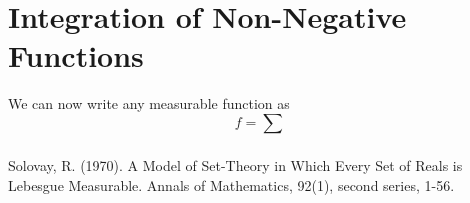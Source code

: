 \documentclass{article}
\theoremstyle{definition}
\theoremstyle{remark}
\theoremstyle{definition}
\theoremstyle{definition}
\theoremstyle{definition}
\begin{document}
\section{Integration of Non-Negative Functions}
We can now write any measurable function as 
\[f = \sum_{}\]
\newpage	
\begin{thebibliography}{9}
	Solovay, R. (1970). A Model of Set-Theory in Which Every Set of Reals is Lebesgue Measurable. Annals of Mathematics, 92(1), second series, 1-56.
\end{thebibliography}
\end{document}
